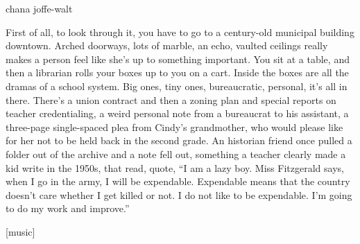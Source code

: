 chana joffe-walt

First of all, to look through it, you have to go to a century-old
municipal building downtown. Arched doorways, lots of marble, an echo,
vaulted ceilings really makes a person feel like she's up to something
important. You sit at a table, and then a librarian rolls your boxes up
to you on a cart. Inside the boxes are all the dramas of a school
system. Big ones, tiny ones, bureaucratic, personal, it's all in there.
There's a union contract and then a zoning plan and special reports on
teacher credentialing, a weird personal note from a bureaucrat to his
assistant, a three-page single-spaced plea from Cindy's grandmother, who
would please like for her not to be held back in the second grade. An
historian friend once pulled a folder out of the archive and a note fell
out, something a teacher clearly made a kid write in the 1950s, that
read, quote, ``I am a lazy boy. Miss Fitzgerald says, when I go in the
army, I will be expendable. Expendable means that the country doesn't
care whether I get killed or not. I do not like to be expendable. I'm
going to do my work and improve.''

{[}music{]}

